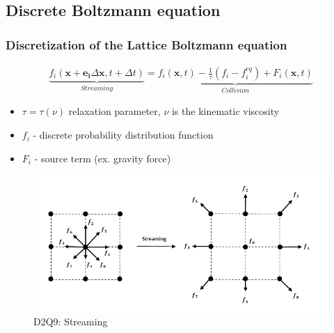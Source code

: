 \documentclass[10pt,handout]{beamer}
\begin{document}
\subsection{Discrete Boltzmann equation}
\begin{frame}\frametitle{Discretization of the Lattice Boltzmann equation}
\pause
\begin{eqnarray} 
  \underbrace{ f_i(\bm{x} + \bm{e_i} \Delta {\bm{x}}, t +  \Delta {t} ) }_{Streaming} =
  \underbrace{ f_i(\bm{x}, t ) - \frac{1}{\tau } ( f_i - f_i^{eq}) + F_i(\bm{x}, t ) }_{Collision} \nonumber
\end{eqnarray}
\begin{itemize}
\item  $\tau = \tau(\nu)$ relaxation parameter, $\nu$ is the kinematic viscosity 
\item $f_i$ - discrete probability distribution function
\item $F_i$ - source term (ex. gravity force)
\end{itemize}
\begin{figure}
  \begin{minipage}[c]{0.6\textwidth}
    \includegraphics[width=\textwidth]{obrazki/streaming.png} 
  \end{minipage}\hfill
  \begin{minipage}[c]{0.4\textwidth} %
    \caption{D2Q9: Streaming} \label{fig:Streaming}
  \end{minipage}
\end{figure}
\end{frame} 
\end{document}
